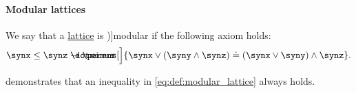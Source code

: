 \paragraph{Modular lattices}

\begin{definition}\label{def:modular_lattice}
  We say that a \hyperref[def:lattice]{lattice} is \term[ru=модулярная (решётка) (\cite[def. 4.6]{Гуров2013ТеорияРешёток})]{modular} if the following axiom holds:
  \begin{equation}\label{eq:def:modular_lattice}
    \synx \leq \synz \synimplies \parens[\Big]{ \synx \vee (\syny \wedge \synz) \syneq (\synx \vee \syny) \wedge \synz }.
  \end{equation}
\end{definition}
\begin{comments}
  \item {} demonstrates that an inequality in \eqref{eq:def:modular_lattice} always holds.
\end{comments}

